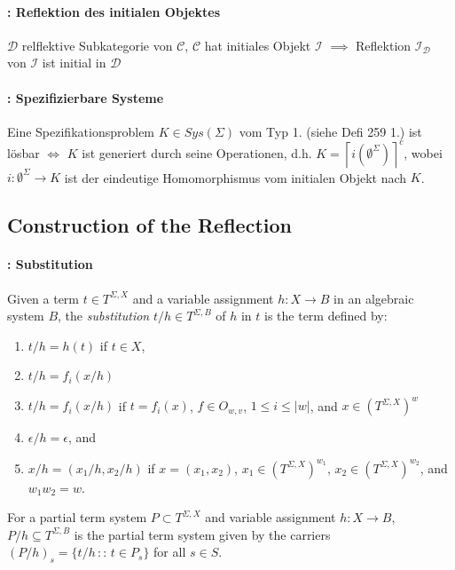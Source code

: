 \paragraph{: Reflektion des initialen Objektes}
$\mathcal{D}$ relflektive Subkategorie von $\mathcal{C}$, $\mathcal{C}$ hat initiales Objekt $\mathcal{I}$ $\implies$ Reflektion $\mathcal{I}_{\mathcal{D}}$ von $\mathcal{I}$ ist initial in $\mathcal{D}$

\paragraph{: Spezifizierbare Systeme}
Eine Spezifikationsproblem $K \in Sys(\Sigma)$ vom Typ 1. (siehe Defi 259 1.) ist lösbar $\Leftrightarrow$ $K$ ist generiert durch seine Operationen, d.h. $K = \left\lceil i\left(\emptyset^{\Sigma}\right)\right\rceil ^{c}$, wobei $i: \emptyset^\Sigma \rightarrow K$ ist der eindeutige Homomorphismus vom initialen Objekt nach $K$.



\subsection{Construction of the Reflection}

\paragraph{: Substitution} Given a term $t\in T^{\Sigma,X}$
and a variable assignment $h:X\rightarrow B$ in an algebraic system
$B$, the \emph{substitution} $t/h\in T^{\Sigma,B}$ of $h$ in $t$
is the term defined by: 
\begin{enumerate}
\item $t/h=h(t)$ if $t\in X$, 
\item $t/h=f_{i}(x/h)$
\item $t/h=f_{i}(x/h)$
if $t=f_{i}(x)$, $f\in O_{w,v}$, $1\leq i\leq|w|$, and $x\in\left(T^{\Sigma,X}\right)^{w}$
\item $\epsilon/h=\epsilon$, and
\item $x/h=\left(x_{1}/h,x_{2}/h\right)$
if $x=\left(x_{1},x_{2}\right)$, $x_{1}\in\left(T^{\Sigma,X}\right)^{w_{1}}$,
$x_{2}\in\left(T^{\Sigma,X}\right)^{w_{2}}$, and $w_{1}w_{2}=w$.
\end{enumerate}


For a partial term system $P\subset T^{\Sigma,X}$ and variable assignment
$h:X\rightarrow B$, $P/h\subseteq T^{\Sigma,B}$ is the partial term
system given by the carriers $\left(P/h\right)_{s}=\{t/h\,::\, t\in P_{s}\}$
for all $s\in S$.


